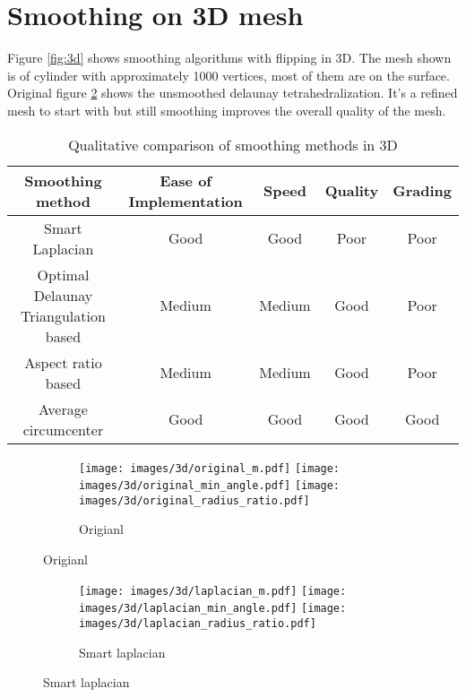 \section{Smoothing on 3D mesh}
Figure \ref{fig:3d} shows smoothing algorithms with flipping in 3D. The mesh shown is of cylinder with approximately 1000 vertices, most of them are on the surface. Original figure \ref{fig:original_3d} shows the unsmoothed delaunay tetrahedralization. It's a refined mesh to start with but still smoothing improves the overall quality of the mesh.

\begin{table}[ht]
\caption{Qualitative comparison of smoothing methods in 3D}
\begin{center}
\begin{tabular}{ |c|c|c|c|c| } 
\hline
Smoothing method & Ease of Implementation & Speed & Quality & Grading \\ 
\hline
Smart Laplacian & Good & Good & Poor & Poor \\ 
\hline
Optimal Delaunay Triangulation based & Medium & Medium & Good & Poor \\ 
\hline
Aspect ratio based & Medium & Medium & Good & Poor  \\ 
\hline
Average circumcenter & Good & Good & Good & Good  \\
\hline
\end{tabular}
\end{center}
\end{table}

\begin{figure}[H]
    \centering
    \begin{subfigure}[b]{1.0\textwidth}
        \texttt{[image: images/3d/original\_m.pdf]}
        \texttt{[image: images/3d/original\_min\_angle.pdf]}
        \texttt{[image: images/3d/original\_radius\_ratio.pdf]}
        \caption{Origianl}       
        \label{fig:original_3d}  
    \end{subfigure}
\end{figure}

\begin{figure}[H]
	\ContinuedFloat
    \centering
    \begin{subfigure}[b]{1.0\textwidth}
        \texttt{[image: images/3d/laplacian\_m.pdf]}
        \texttt{[image: images/3d/laplacian\_min\_angle.pdf]}
        \texttt{[image: images/3d/laplacian\_radius\_ratio.pdf]}
        \caption{Smart laplacian}       
        \label{fig:avg_sl_3d}        
    \end{subfigure}
\end{figure}

